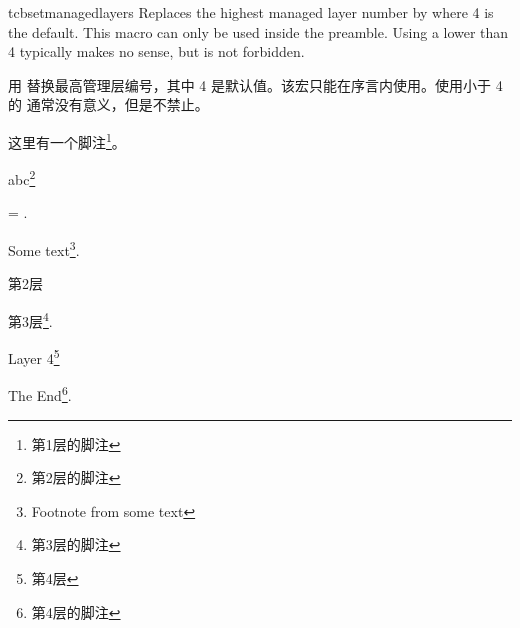 \begin{docCommand}{tcbsetmanagedlayers}{}
Replaces the highest managed layer number by  where 4 is
the default. This macro can only be used inside the preamble.
Using a  lower than 4 typically makes no sense, but is
not forbidden.

用  替换最高管理层编号，其中 4 是默认值。该宏只能在序言内使用。使用小于 4 的  通常没有意义，但是不禁止。
\end{docCommand}

\begin{tcboutputlisting}
\begin{tcolorbox}[enhanced jigsaw,breakable,title=第1层盒子]
这里有一个脚注\footnote{第1层的脚注}。
\lipsum[2]
\begin{tcolorbox}[title=第2层盒子]
abc\footnote{第2层的脚注}
\end{tcolorbox}
\begin{tcolorbox}[title=Another Box,ams equation]
     = \infty.
\end{tcolorbox}
Some text\footnote{Footnote from some text}.
\begin{tcolorbox}[title=Yet Another Box]%
    第2层
    \tcboxfit[height=2cm]{\lipsum[1]}
    \begin{tcolorbox}
    第3层\footnote{第3层的脚注}. \lipsum[3]
    \begin{tcolorbox}[title=Layer 4,colframe=blue,colback=white]
        Layer 4\footnote{第4层}
    \end{tcolorbox}
    The End\footnote{第4层的脚注}.
    \end{tcolorbox}
\end{tcolorbox}
\end{tcolorbox}
\end{tcboutputlisting}


{\tcbuselistingtext}
